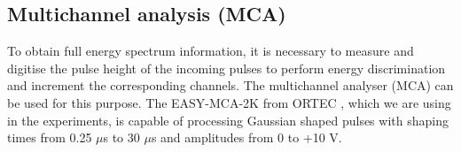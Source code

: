 \subsection{Multichannel analysis (MCA)}
To obtain full energy spectrum information, it is necessary to measure and digitise the pulse height of the incoming pulses to perform energy discrimination and increment the corresponding channels. The multichannel analyser (MCA) can be used for this purpose. The EASY-MCA-2K from ORTEC \cite{MCAOrtec}, which we are using in the experiments, is capable of processing Gaussian shaped pulses with shaping times from 0.25 $\mu$s to 30 $\mu$s and amplitudes from 0 to +10 V.




